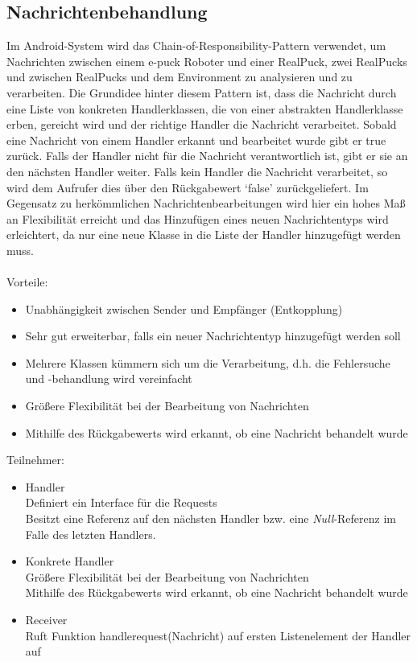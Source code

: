 \documentclass[10pt,a4paper]{article}
\begin{document}
  		\subsection{Nachrichtenbehandlung}
  			Im Android-System wird das Chain-of-Responsibility-Pattern verwendet, um Nachrichten zwischen einem e-puck Roboter und einer
  			RealPuck, zwei RealPucks und zwischen RealPucks und dem Environment zu analysieren und zu verarbeiten. Die Grundidee hinter
  			diesem Pattern ist, dass die Nachricht durch eine Liste
  			von konkreten Handlerklassen, die von einer abstrakten Handlerklasse erben, gereicht wird und der richtige Handler die Nachricht
  			verarbeitet. Sobald eine Nachricht von einem Handler erkannt und bearbeitet wurde gibt er true zurück. Falls der Handler nicht
  			für die Nachricht verantwortlich ist, gibt er sie an den nächsten Handler weiter. Falls kein Handler die Nachricht verarbeitet, so wird
  			dem Aufrufer dies über den Rückgabewert `false' zurückgeliefert. Im Gegensatz zu herkömmlichen Nachrichtenbearbeitungen wird hier ein
  			hohes Maß an Flexibilität erreicht und das Hinzufügen eines neuen Nachrichtentyps wird erleichtert, da nur eine neue Klasse in die
  			Liste der Handler hinzugefügt werden muss. \\ \\
  			Vorteile:
  			\begin{itemize}
  				\item Unabhängigkeit zwischen Sender und Empfänger (Entkopplung)
  				\item Sehr gut erweiterbar, falls ein neuer Nachrichtentyp hinzugefügt werden soll
  				\item Mehrere Klassen kümmern sich um die Verarbeitung, d.h. die Fehlersuche und -behandlung wird vereinfacht
  				\item Größere Flexibilität bei der Bearbeitung von Nachrichten
  				\item Mithilfe des Rückgabewerts wird erkannt, ob eine Nachricht behandelt wurde
  			\end{itemize}  
  			Teilnehmer:
   			\begin{itemize}
  				\item Handler\\Definiert ein Interface für die Requests\\Besitzt eine Referenz auf den nächsten Handler bzw. eine \textit{Null}-Referenz
  					im Falle des letzten Handlers.
  				\item Konkrete Handler\\Größere Flexibilität bei der Bearbeitung von Nachrichten\\
  					Mithilfe des Rückgabewerts wird erkannt, ob eine Nachricht behandelt wurde
  				\item Receiver \\ Ruft Funktion handlerequest(Nachricht) auf ersten Listenelement der Handler auf
  			\end{itemize}   	
\end{document}
